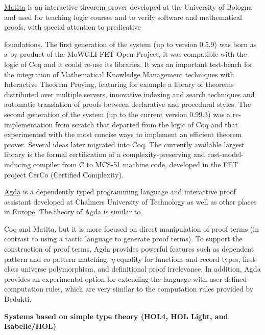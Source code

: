\medskip
\noindent\href{http://matita.cs.unibo.it/}{Matita} is an interactive theorem prover developed at the University of
Bologna and used for teaching logic courses and to verify software and
mathematical proofs, with special attention to predicative
\begin{figure}\centering{}\end{figure}
foundations. The first generation of the system (up to version 0.5.9)
was born as a by-product of the MoWGLI FET-Open Project, it was
compatible with the logic of Coq and it could re-use its libraries. It
was an important
test-bench for the integration of Mathematical Knowledge Management techniques
with Interactive Theorem Proving,
featuring for example a library of theorems distributed over multiple
servers, innovative indexing and search techniques and automatic
translation of proofs between declarative and procedural styles. The
second generation of the system (up to the current version 0.99.3) was
a re-implementation from scratch that departed from the logic of Coq
and that experimented with the most concise ways to implement an
efficient theorem prover. Several ideas later migrated into Coq. The
currently available largest library is the formal certification of a
complexity-preserving and cost-model-inducing compiler from C to
MCS-51 machine code, developed in the FET project CerCo (Certified
Complexity).

\medskip
\noindent\href{https://wiki.portal.chalmers.se/agda/pmwiki.php}{Agda} is a
dependently typed programming language and interactive proof assistant developed
at Chalmers University of Technology as well as other places in Europe. The
theory of Agda is similar
to \begin{figure}\centering{}\end{figure} Coq and
Matita, but it is more focused on direct manipulation of proof terms (in
contrast to using a tactic language to generate proof terms). To support the
construction of proof terms, Agda provides powerful features such as dependent
pattern and co-pattern matching, $\eta$-equality for functions and record types,
first-class universe polymorphism, and definitional proof irrelevance. In
addition, Agda provides an experimental option for extending the language with
user-defined computation rules, which are very similar to the computation rules
provided by Dedukti.

\medskip
\noindent
{\bf Systems based on simple type theory (HOL4, HOL Light, and Isabelle/HOL)}
\medskip

